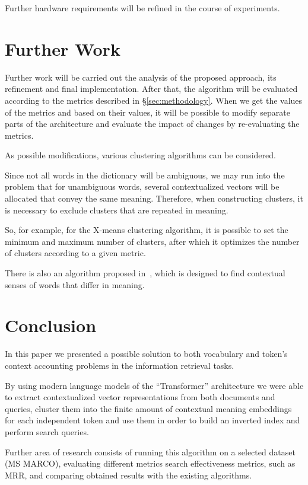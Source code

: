 \documentclass[
    twocolumn,
]{template/ceurart}
\begin{document}
    Further hardware requirements will be refined in the course of experiments.


    \section{Further Work}
    Further work will be carried out the analysis of the proposed approach, its refinement and final implementation.
    After that, the algorithm will be evaluated according to the metrics described in \S\ref{sec:methodology}.
    When we get the values of the metrics and based on their values, it will be possible to modify
    separate parts of the architecture and evaluate the impact of changes by re-evaluating the metrics.

    As possible modifications, various clustering algorithms can be considered.

    Since not all words in the dictionary will be ambiguous, we may run into the problem that for unambiguous words,
    several contextualized vectors will be allocated that convey the same meaning.
    Therefore, when constructing clusters, it is necessary to exclude clusters that are repeated in meaning.

    So, for example, for the X-means clustering algorithm, it is possible to set the minimum and maximum
    number of clusters, after which it optimizes the number of clusters according to a given metric.

    There is also an algorithm proposed in~\cite{logachevaEtal2020Word}, which is designed
    to find contextual senses of words that differ in meaning.


    \section{Conclusion}

    In this paper we presented a possible solution to both vocabulary and token's context accounting problems in
    the information retrieval tasks.

    By using modern language models of the ``Transformer'' architecture we were able to extract contextualized vector
    representations from both documents and queries, cluster them into the finite amount of contextual meaning
    embeddings for each independent token
    and use them in order to build an inverted index and perform search queries.

    Further area of research consists of running this algorithm on a selected dataset (MS MARCO),
    evaluating different metrics search effectiveness metrics, such as MRR, and comparing obtained results with the
    existing algorithms.


    
\end{document}

